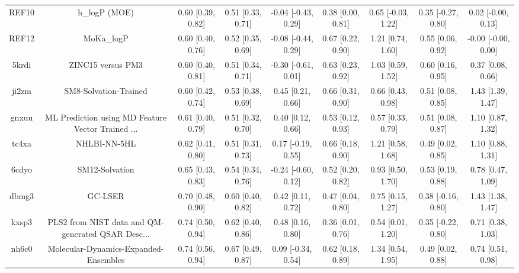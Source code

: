 \documentclass{article}
\begin{document}
\begin{center}
\begin{longtable}{|ccccccccc|}
 REF10 &                                      h\_logP (MOE) &  0.60 [0.39, 0.82] &  0.51 [0.33, 0.71] &   -0.04 [-0.43, 0.29] &  0.38 [0.00, 0.81] &   0.65 [-0.03, 1.22] &   0.35 [-0.27, 0.80] &    0.02 [-0.00, 0.13] \\
 REF12 &                                         MoKa\_logP &  0.60 [0.40, 0.76] &  0.52 [0.35, 0.69] &   -0.08 [-0.44, 0.29] &  0.67 [0.22, 0.90] &    1.21 [0.74, 1.60] &    0.55 [0.06, 0.92] &   -0.00 [-0.00, 0.00] \\
 5krdi &                                  ZINC15 versus PM3 &  0.60 [0.40, 0.81] &  0.51 [0.34, 0.71] &   -0.30 [-0.61, 0.01] &  0.63 [0.23, 0.92] &    1.03 [0.59, 1.52] &    0.60 [0.16, 0.95] &     0.37 [0.08, 0.66] \\
 ji2zm &                              SM8-Solvation-Trained &  0.60 [0.42, 0.74] &  0.53 [0.38, 0.69] &     0.45 [0.21, 0.66] &  0.66 [0.31, 0.90] &    0.66 [0.43, 0.98] &    0.51 [0.08, 0.85] &     1.43 [1.39, 1.47] \\
 gnxuu &  ML Prediction using MD Feature Vector Trained ... &  0.61 [0.40, 0.79] &  0.51 [0.32, 0.70] &     0.40 [0.12, 0.66] &  0.53 [0.12, 0.93] &    0.57 [0.33, 0.79] &    0.51 [0.08, 0.87] &     1.10 [0.87, 1.32] \\
 tc4xa &                                       NHLBI-NN-5HL &  0.62 [0.41, 0.80] &  0.51 [0.31, 0.73] &    0.17 [-0.19, 0.55] &  0.66 [0.18, 0.90] &    1.21 [0.58, 1.68] &    0.49 [0.02, 0.85] &     1.10 [0.88, 1.31] \\
 6cdyo &                                     SM12-Solvation &  0.65 [0.43, 0.83] &  0.54 [0.34, 0.76] &   -0.24 [-0.60, 0.12] &  0.52 [0.20, 0.82] &    0.93 [0.50, 1.70] &    0.53 [0.19, 0.88] &     0.78 [0.47, 1.09] \\
 dbmg3 &                                            GC-LSER &  0.70 [0.48, 0.90] &  0.60 [0.40, 0.82] &     0.42 [0.11, 0.72] &  0.47 [0.04, 0.80] &    0.75 [0.15, 1.27] &   0.38 [-0.16, 0.80] &     1.43 [1.38, 1.47] \\
 kxsp3 &  PLS2 from NIST data and QM-generated QSAR Desc... &  0.74 [0.50, 0.94] &  0.62 [0.40, 0.86] &     0.48 [0.16, 0.80] &  0.36 [0.01, 0.76] &    0.54 [0.01, 1.20] &   0.35 [-0.22, 0.80] &     0.71 [0.38, 1.03] \\
 nh6c0 &              Molecular-Dynamics-Expanded-Ensembles &  0.74 [0.56, 0.94] &  0.67 [0.49, 0.87] &    0.09 [-0.34, 0.54] &  0.62 [0.18, 0.89] &    1.34 [0.54, 1.95] &    0.49 [0.02, 0.88] &     0.74 [0.51, 0.98] \\

\end{longtable}
\end{center}
\end{document}
